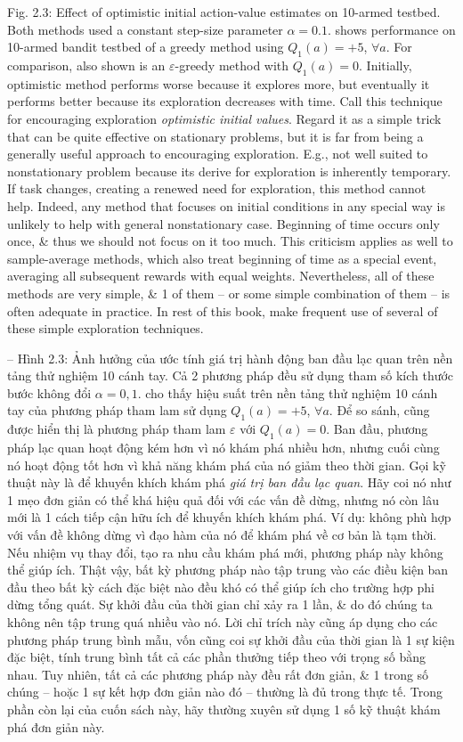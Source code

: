 \documentclass{article}
\begin{document}
\begin{itemize}
\begin{itemize}
        {\sf Fig. 2.3: Effect of optimistic initial action-value estimates on 10-armed testbed. Both methods used a constant step-size parameter $\alpha = 0.1$.} shows performance on 10-armed bandit testbed of a greedy method using $Q_1(a) = +5$, $\forall a$. For comparison, also shown is an $\varepsilon$-greedy method with $Q_1(a) = 0$. Initially, optimistic method performs worse because it explores more, but eventually it performs better because its exploration decreases with time. Call this technique for encouraging exploration {\it optimistic initial values}. Regard it as a simple trick that can be quite effective on stationary problems, but it is far from being a generally useful approach to encouraging exploration. E.g., not well suited to nonstationary problem because its derive for exploration is inherently temporary. If task changes, creating a renewed need for exploration, this method cannot help. Indeed, any method that focuses on initial conditions in any special way is unlikely to help with general nonstationary case. Beginning of time occurs only once, \& thus we should not focus on it too much. This criticism applies as well to sample-average methods, which also treat beginning of time as a special event, averaging all subsequent rewards with equal weights. Nevertheless, all of these methods are very simple, \& 1 of them -- or some simple combination of them -- is often adequate in practice. In rest of this book, make frequent use of several of these simple exploration techniques.

        -- {\sf Hình 2.3: Ảnh hưởng của ước tính giá trị hành động ban đầu lạc quan trên nền tảng thử nghiệm 10 cánh tay. Cả 2 phương pháp đều sử dụng tham số kích thước bước không đổi $\alpha = 0,1$.} cho thấy hiệu suất trên nền tảng thử nghiệm 10 cánh tay của phương pháp tham lam sử dụng $Q_1(a) = +5$, $\forall a$. Để so sánh, cũng được hiển thị là phương pháp tham lam $\varepsilon$ với $Q_1(a) = 0$. Ban đầu, phương pháp lạc quan hoạt động kém hơn vì nó khám phá nhiều hơn, nhưng cuối cùng nó hoạt động tốt hơn vì khả năng khám phá của nó giảm theo thời gian. Gọi kỹ thuật này là để khuyến khích khám phá {\it giá trị ban đầu lạc quan}. Hãy coi nó như 1 mẹo đơn giản có thể khá hiệu quả đối với các vấn đề dừng, nhưng nó còn lâu mới là 1 cách tiếp cận hữu ích để khuyến khích khám phá. Ví dụ: không phù hợp với vấn đề không dừng vì đạo hàm của nó để khám phá về cơ bản là tạm thời. Nếu nhiệm vụ thay đổi, tạo ra nhu cầu khám phá mới, phương pháp này không thể giúp ích. Thật vậy, bất kỳ phương pháp nào tập trung vào các điều kiện ban đầu theo bất kỳ cách đặc biệt nào đều khó có thể giúp ích cho trường hợp phi dừng tổng quát. Sự khởi đầu của thời gian chỉ xảy ra 1 lần, \& do đó chúng ta không nên tập trung quá nhiều vào nó. Lời chỉ trích này cũng áp dụng cho các phương pháp trung bình mẫu, vốn cũng coi sự khởi đầu của thời gian là 1 sự kiện đặc biệt, tính trung bình tất cả các phần thưởng tiếp theo với trọng số bằng nhau. Tuy nhiên, tất cả các phương pháp này đều rất đơn giản, \& 1 trong số chúng -- hoặc 1 sự kết hợp đơn giản nào đó -- thường là đủ trong thực tế. Trong phần còn lại của cuốn sách này, hãy thường xuyên sử dụng 1 số kỹ thuật khám phá đơn giản này.


\end{itemize}
\end{itemize}
\end{document}
